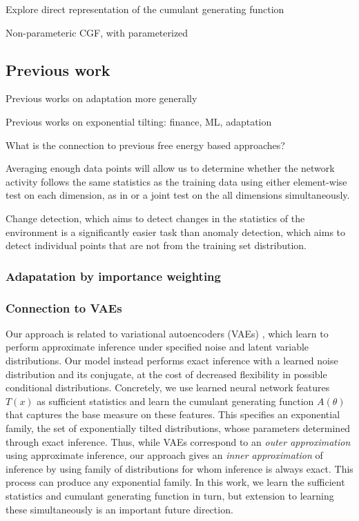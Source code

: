 \documentclass[11pt]{article}      %
\begin{document}
Explore direct representation of the cumulant generating function 

Non-parameteric CGF, with parameterized 



\subsection{Previous work}


Previous works on adaptation more generally

Previous works on exponential tilting: finance, ML, adaptation 


What is the connection to previous free energy based approaches?


Averaging enough data points will allow us to determine whether the network activity follows the same statistics as the training data using either element-wise test on each dimension, as in \cite{rabanser_failing_2019} or a joint test on the all dimensions simultaneously.


Change detection, which aims to detect changes in the statistics of the environment is a significantly easier task than anomaly detection, which aims to detect individual points that are not from the training set distribution.


\subsubsection{Adapatation by importance weighting}





\subsubsection{Connection to VAEs}

Our approach is related to variational autoencoders (VAEs) \cite{kingma_auto-encoding_2013}, which learn to perform approximate inference under specified noise and latent variable distributions. 
Our model instead performs exact inference with a learned noise distribution and its conjugate, at the cost of decreased flexibility in possible conditional distributions.
Concretely, we use learned neural network features $T(x)$ as sufficient statistics and learn the cumulant generating function $A(\theta)$ that captures the base measure on these features.
This specifies an exponential family, the set of exponentially tilted distributions, whose parameters determined through exact inference.
Thus, while VAEs correspond to an \textit{outer approximation} using approximate inference, our approach gives an \textit{inner approximation} of inference by using family of distributions for whom inference is always exact.
This process can produce any exponential family.
In this work, we learn the sufficient statistics and cumulant generating function in turn, but extension to learning these simultaneously is an important future direction.
\end{document}
